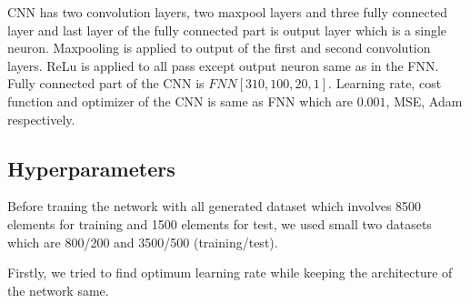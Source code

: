 \documentclass[a4paper,times,12pt]{article}
\begin{document}
CNN has two convolution layers, two maxpool layers and three fully connected layer and last layer of the fully connected part is output layer which is a single neuron. Maxpooling is applied to output of the first and second convolution layers. ReLu is applied to all pass except output neuron same as in the FNN. Fully connected part of the CNN is $FNN[310, 100, 20, 1]$. Learning rate, cost function and optimizer of the CNN is same as FNN which are $0.001$, MSE, Adam respectively.


\subsection{Hyperparameters}

Before traning the network with all generated dataset which involves 8500 elements for training and 1500 elements for test, we used small two datasets which are 800/200 and 3500/500 (training/test).

Firstly, we tried to find optimum learning rate while keeping the architecture of the network same. 


\newpage
\end{document}
